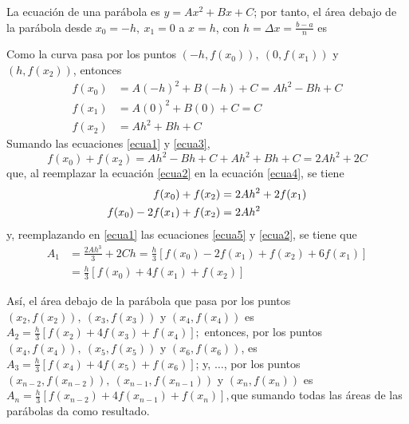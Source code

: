 La ecuación de una parábola es $y=Ax^{2}+Bx+C$; por tanto, el área debajo de la parábola desde $x_{0}=-h,\ x_{1}=0$ a $x=h$, con $h=\Delta x=\frac{b-a}{n}$ es




Como la curva pasa por los puntos $(-h,f(x_{0})),\ (0,f(x_{1}))$ y $(h,f(x_{2}))$, entonces
{\small
\begin{align}
f(x_{0}) &=A(-h)^{2}+B(-h)+C=Ah^{2}-Bh+C\label{ecua1}\\
f(x_{1}) &=A(0)^{2}+B(0)+C=C\label{ecua2}\\
f(x_{2}) &=Ah^{2}+Bh+C\label{ecua3}
\end{align}
}
Sumando las ecuaciones \eqref{ecua1} y \eqref{ecua3},
{\small
\begin{equation}\label{ecua4}
f(x_{0})+f(x_{2})=Ah^{2}-Bh+C+Ah^{2}+Bh+C=2Ah^{2}+2C
\end{equation}
}
que, al reemplazar la ecuación \eqref{ecua2} en la ecuación \eqref{ecua4}, se tiene
{\small
\begin{align}
f(x_{0})+f(x_{2})&=2Ah^{2}+2f(x_{1})\notag\\
f(x_{0})-2f(x_{1})+f(x_{2})&=2Ah^{2}\label{ecua5}
\end{align}
}
y, reemplazando en \eqref{ecua1} las ecuaciones \eqref{ecua5} y \eqref{ecua2}, se tiene que %
\begin{align*}
A_{1}&=\frac{2Ah^{3}}{3}+2Ch=\frac{h}{3}\left[
f(x_{0})-2f(x_{1})+f(x_{2})+6f(x_{1})\right] \\
&=\frac{h}{3}\left[
f(x_{0})+4f(x_{1})+f(x_{2})\right]
\end{align*}

Así, el área debajo de la parábola que pasa por los puntos {\footnotesize $(x_{2},f(x_{2})),\ (x_{3},f(x_{3}))$} y {\footnotesize $(x_{4},f(x_{4}))$} es {\footnotesize $A_{2}=\frac{h}{3}\left[ f(x_{2})+4f(x_{3})+f(x_{4})\right];$} entonces, por los puntos {\footnotesize $(x_{4},f(x_{4})),\ (x_{5},f(x_{5}))$} y {\footnotesize $(x_{6},f(x_{6}))$,} es {\footnotesize $A_{3}=\frac{h}{3}\left[ f(x_{4})+4f(x_{5})+f(x_{6})\right]$;} y, $\ldots$, por los puntos $(x_{n-2},f(x_{n-2})),\ (x_{n-1},f(x_{n-1}))$ y $(x_{n},f(x_{n}))$ es $A_{n}=\frac{h}{3}\left[ f(x_{n-2})+4f(x_{n-1})+f(x_{n})\right],$que sumando todas las áreas de las parábolas da como resultado. %



